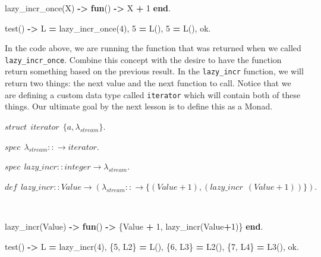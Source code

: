 \documentclass[
]{book}
\newenvironment{Shaded}{\begin{snugshade}}{\end{snugshade}}
\newcommand{\CharTok}[1]{\textcolor[rgb]{0.31,0.60,0.02}{#1}}
\newcommand{\DecValTok}[1]{\textcolor[rgb]{0.00,0.00,0.81}{#1}}
\newcommand{\FunctionTok}[1]{\textcolor[rgb]{0.00,0.00,0.00}{#1}}
\newcommand{\KeywordTok}[1]{\textcolor[rgb]{0.13,0.29,0.53}{\textbf{#1}}}
\newcommand{\OperatorTok}[1]{\textcolor[rgb]{0.81,0.36,0.00}{\textbf{#1}}}
\newcommand{\VariableTok}[1]{\textcolor[rgb]{0.00,0.00,0.00}{#1}}
\begin{document}
\begin{Shaded}
\begin{Highlighting}[]
\FunctionTok{lazy\_incr\_once(}\VariableTok{X}\FunctionTok{)} \OperatorTok{{-}\textgreater{}} \KeywordTok{fun}\FunctionTok{()} \OperatorTok{{-}\textgreater{}} \VariableTok{X} \OperatorTok{+} \DecValTok{1} \KeywordTok{end}\FunctionTok{.}

\FunctionTok{test()} \OperatorTok{{-}\textgreater{}}
    \VariableTok{L} \OperatorTok{=} \FunctionTok{lazy\_incr\_once(}\DecValTok{4}\FunctionTok{),}
    \DecValTok{5} \OperatorTok{=} \VariableTok{L}\FunctionTok{(),}
    \DecValTok{5} \OperatorTok{=} \VariableTok{L}\FunctionTok{(),}
    \CharTok{ok}\FunctionTok{.}
\end{Highlighting}
\end{Shaded}

In the code above, we are running the function that was returned when we called \texttt{lazy\_incr\_once}. Combine this concept with the desire to have the function return something based on the previous result. In the \texttt{lazy\_incr} function, we will return two things: the next value and the next function to call. Notice that we are defining a custom data type called \texttt{iterator} which will contain both of these things. Our ultimate goal by the next lesson is to define this as a Monad.

\begin{formulabox}
\(struct ~ ~ iterator ~ ~ \lbrace a, \lambda_{stream} \rbrace.\)

\(spec ~ ~ \lambda_{stream} :: \rightarrow iterator.\)

\(spec ~ ~ lazy\_incr :: integer \rightarrow \lambda_{stream}.\)

\(de\mathit{f} ~ ~ lazy\_incr :: Value \rightarrow (\lambda_{stream} :: \rightarrow \lbrace (Value + 1), (lazy\_incr ~ ~ (Value + 1)) \rbrace).\)

\end{formulabox}

\(\nonumber\)

\begin{Shaded}
\begin{Highlighting}[]
\FunctionTok{lazy\_incr(}\VariableTok{Value}\FunctionTok{)} \OperatorTok{{-}\textgreater{}} \KeywordTok{fun}\FunctionTok{()} \OperatorTok{{-}\textgreater{}} \FunctionTok{\{}\VariableTok{Value} \OperatorTok{+} \DecValTok{1}\FunctionTok{,} \FunctionTok{lazy\_incr(}\VariableTok{Value}\OperatorTok{+}\DecValTok{1}\FunctionTok{)\}} \KeywordTok{end}\FunctionTok{.}

\FunctionTok{test()} \OperatorTok{{-}\textgreater{}}
    \VariableTok{L} \OperatorTok{=} \FunctionTok{lazy\_incr(}\DecValTok{4}\FunctionTok{),}
    \FunctionTok{\{}\DecValTok{5}\FunctionTok{,} \VariableTok{L2}\FunctionTok{\}} \OperatorTok{=} \VariableTok{L}\FunctionTok{(),}
    \FunctionTok{\{}\DecValTok{6}\FunctionTok{,} \VariableTok{L3}\FunctionTok{\}} \OperatorTok{=} \VariableTok{L2}\FunctionTok{(),}
    \FunctionTok{\{}\DecValTok{7}\FunctionTok{,} \VariableTok{L4}\FunctionTok{\}} \OperatorTok{=} \VariableTok{L3}\FunctionTok{(),}
    \CharTok{ok}\FunctionTok{.}
\end{Highlighting}
\end{Shaded}
\end{document}
